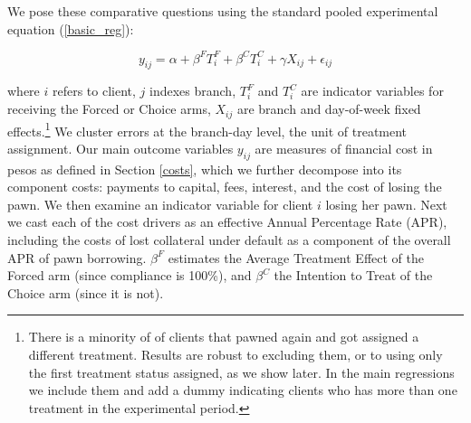 \documentclass[oneside,11pt]{article}
\begin{document}
We pose these comparative questions using the standard pooled experimental equation (\ref{basic_reg}):

\begin{equation} \label{basic_reg}
    y_{ij} = \alpha + \beta^F T_{i}^F + \beta^C T_{i}^C + \gamma X_{ij} + \epsilon_{ij}
\end{equation}

\noindent where $i$ refers to client, $j$ indexes branch, $T_{i}^F$ and $T_{i}^C$ are indicator variables for receiving the Forced or Choice arms, $X_{ij}$ are branch and day-of-week fixed effects.\footnote{There is a minority of of clients that pawned again and got assigned a different treatment. Results are robust to excluding them, or to using only the first treatment status assigned, as we show later.  In the main regressions we include them and add a dummy indicating clients who has more than one treatment in the experimental period.} We cluster errors at the branch-day level, the unit of treatment assignment. %
Our main outcome variables $y_{ij}$ are measures of financial cost in pesos as defined in Section \ref{costs}, which we further decompose into its component costs:  payments to capital, fees, interest, and the cost of losing the pawn.  We then examine an indicator variable for client $i$ losing her pawn.  Next we cast each of the cost drivers as an effective Annual Percentage Rate (APR), including the costs of lost collateral under default as a component of the overall APR of pawn borrowing.  $\beta^F$ estimates the Average Treatment Effect of the Forced arm (since compliance is 100\%), and  $\beta^C$ the Intention to Treat of the Choice arm (since it is not).






\end{document}
